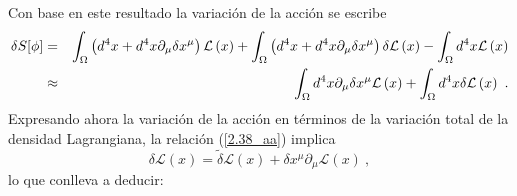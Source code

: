 \noindent
Con base en este resultado la variación de la acción se escribe
\begin{eqnarray}
\delta S[\phi ] &=&\int_{\Omega }\left( d^{4}x+d^{4}x\partial _{\mu }\delta x^{\mu }\right) \mathcal{L}\left( x\right) +\int_{\Omega }\left(d^{4}x+d^{4}x\partial _{\mu }\delta x^{\mu }\right) \delta \mathcal{L}\left(x\right) -\int_{\Omega }d^{4}x\mathcal{L}\left( x\right)   \notag \\
&\approx &\int_{\Omega }d^{4}x\partial _{\mu }\delta x^{\mu }\mathcal{L} \left( x\right) +\int_{\Omega }d^{4}x\delta \mathcal{L}\left( x\right) ~.
\end{eqnarray}
Expresando ahora la variación de la acción en términos de la variación total de la densidad Lagrangiana, la relación (\ref{2.38_aa}) implica 
\begin{equation}
\delta \mathcal{L}\left( x\right) =\tilde{\delta}\mathcal{L}\left( x\right)
+\delta x^{\mu }\partial _{\mu }\mathcal{L}\left( x\right) ~,
\end{equation}
lo que conlleva a deducir:

